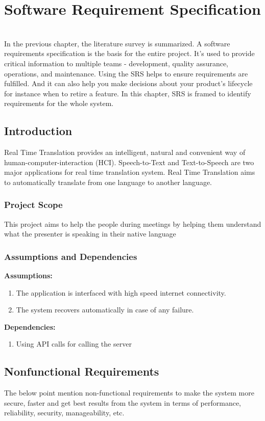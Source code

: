 \chapter{Software Requirement Specification}
\\
{\normalsize {In the previous chapter, the literature survey is summarized. A software requirements specification is the basis for the entire project. It’s used to provide critical information to multiple teams - development, quality assurance, operations, and maintenance. Using the SRS helps to ensure requirements are fulfilled. And it can also help you make decisions about your product’s lifecycle for instance when to retire a feature. In this chapter, SRS is framed to identify requirements for the whole system.}}
\clearpage
\section{Introduction}
{\normalsize {Real Time Translation provides an intelligent, natural and convenient way of human-computer-interaction (HCI). Speech-to-Text and Text-to-Speech are two major applications for real time translation system. Real Time Translation aims to automatically translate from one language to another language.}}
\subsection{Project Scope}
{\normalsize{This project aims to help the people during meetings by helping them understand what the presenter is speaking in their native language}}
\subsection{Assumptions and Dependencies}
{\normalsize{\textbf{Assumptions:}}}
\begin{enumerate}
    \item The application is interfaced with high speed internet connectivity. 
    \item The system recovers automatically in case of any failure. 
\end{enumerate}
{\normalsize{\textbf{Dependencies:}}}
\begin{enumerate}
    \item Using API calls for calling the server
\end{enumerate}

\newpage
\section{Nonfunctional Requirements}
{\normalsize{The below point mention non-functional requirements to make the system more secure, faster and get best results from the system in terms of performance, reliability, security, manageability, etc.}}

